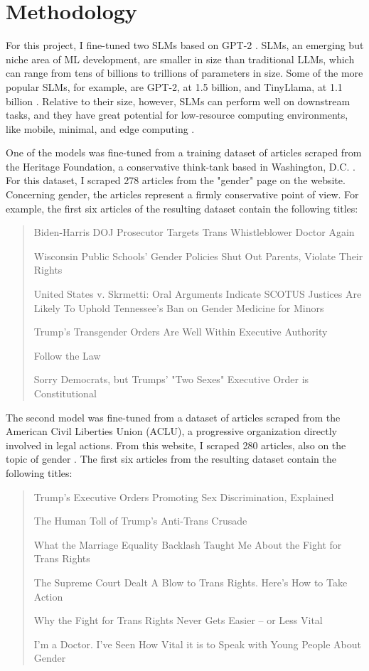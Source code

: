 \documentclass{article}
\begin{document}
\section{Methodology}

For this project, I fine-tuned two SLMs based on GPT-2 \citep{radford_2018}. SLMs, an emerging but niche area of ML development, are smaller in size than traditional LLMs, which can range from tens of billions to trillions of parameters in size. Some of the more popular SLMs, for example, are GPT-2, at 1.5 billion, and TinyLlama, at 1.1 billion \citep{zhang_2024}. Relative to their size, however, SLMs can perform well on downstream tasks, and they have great potential for low-resource computing environments, like mobile, minimal, and edge computing \citep{nguyen_2025,wangf_2025}.

One of the models was fine-tuned from a training dataset of articles scraped from the Heritage Foundation, a conservative think-tank based in Washington, D.C. \citep{heritage_2026}. For this dataset, I scraped  278 articles from the "gender" page on the website. Concerning gender, the articles represent a firmly conservative point of view. For example, the first six articles of the resulting dataset contain the following titles:

\begin{quote}
Biden-Harris DOJ Prosecutor Targets Trans Whistleblower Doctor Again

Wisconsin Public Schools' Gender Policies Shut Out Parents, Violate Their Rights

United States v. Skrmetti: Oral Arguments Indicate SCOTUS Justices Are Likely To Uphold Tennessee's Ban on Gender Medicine for Minors

Trump's Transgender Orders Are Well Within Executive Authority

Follow the Law

Sorry Democrats, but Trumps' "Two Sexes" Executive Order is Constitutional

\end{quote}

The second model was fine-tuned from a dataset of articles scraped from the American Civil Liberties Union (ACLU), a progressive organization directly involved in legal actions. From this website, I scraped 280 articles, also on the topic of gender \citep{aclu_2026}. The first six articles from the resulting dataset contain the following titles:

\begin{quote}

Trump's Executive Orders Promoting Sex Discrimination, Explained

The Human Toll of Trump's Anti-Trans Crusade

What the Marriage Equality Backlash Taught Me About the Fight for Trans Rights

The Supreme Court Dealt A Blow to Trans Rights. Here's How to Take Action

Why the Fight for Trans Rights Never Gets Easier – or Less Vital

I'm a Doctor. I've Seen How Vital it is to Speak with Young People About Gender

\end{quote}
\end{document}
